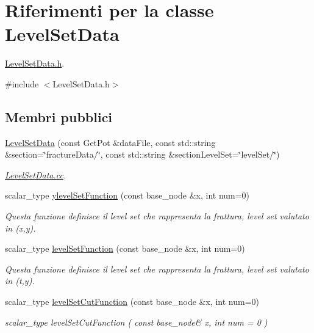 \hypertarget{classLevelSetData}{\section{Riferimenti per la classe Level\-Set\-Data}
\label{classLevelSetData}
}


\hyperlink{LevelSetData_8h}{Level\-Set\-Data.\-h}.  




{\ttfamily \#include $<$Level\-Set\-Data.\-h$>$}

\subsection*{Membri pubblici}
\begin{DoxyCompactItemize}
\item 
\hyperlink{classLevelSetData_a8b2ab7808f47d9a951327891d65e84be}{Level\-Set\-Data} (const Get\-Pot \&data\-File, const std\-::string \&section=\char`\"{}fracture\-Data/\char`\"{}, const std\-::string \&section\-Level\-Set=\char`\"{}level\-Set/\char`\"{})
\begin{DoxyCompactList}\small\item\em \hyperlink{LevelSetData_8cc}{Level\-Set\-Data.\-cc}. \end{DoxyCompactList}\item 
scalar\-\_\-type \hyperlink{classLevelSetData_ab6dee766ab332d7384cc0db802001365}{ylevel\-Set\-Function} (const base\-\_\-node \&x, int num=0)
\begin{DoxyCompactList}\small\item\em Questa funzione definisce il level set che rappresenta la frattura, level set valutato in (x,y). \end{DoxyCompactList}\item 
scalar\-\_\-type \hyperlink{classLevelSetData_a15b4379080b2320c54467c89c3642c4a}{level\-Set\-Function} (const base\-\_\-node \&x, int num=0)
\begin{DoxyCompactList}\small\item\em Questa funzione definisce il level set che rappresenta la frattura, level set valutato in (t,y). \end{DoxyCompactList}\item 
scalar\-\_\-type \hyperlink{classLevelSetData_a080eb321db2710b115ea6ea4344551e8}{level\-Set\-Cut\-Function} (const base\-\_\-node \&x, int num=0)
\begin{DoxyCompactList}\small\item\em scalar\-\_\-type level\-Set\-Cut\-Function ( const base\-\_\-node\& x, int num = 0 ) \end{DoxyCompactList}\item 

\end{DoxyCompactItemize}
